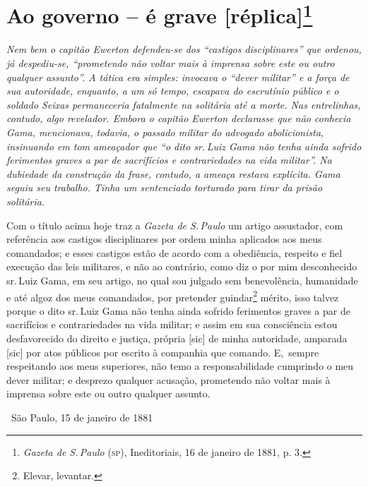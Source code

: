\pagebreak
\section{Ao governo -- é grave {[}réplica{]}\protect\footnote{
\emph{\MakeUppercase{G}azeta de \MakeUppercase{S.\,P}aulo} (\textsc{sp}), \MakeUppercase{I}neditoriais, 16 de janeiro de 1881, p. 3.}}

\begin{resumo}
\emph{Nem bem o capitão Ewerton defendeu-se dos ``castigos disciplinares''
que ordenou, já despediu-se, ``prometendo não voltar mais à imprensa
sobre este ou outro qualquer assunto''. A tática era simples: invocava o
``dever militar'' e a força de sua autoridade, enquanto, a um só tempo,
escapava do escrutínio público e o soldado Seixas permaneceria
fatalmente na solitária até a morte. Nas entrelinhas, contudo, algo
revelador. Embora o capitão Ewerton declarasse que não conhecia Gama,
mencionava, todavia, o passado militar do advogado abolicionista,
insinuando em tom ameaçador que ``o dito sr.\,Luiz Gama não tenha ainda
sofrido ferimentos graves a par de sacrifícios e contrariedades na vida
militar''. Na dubiedade da construção da frase, contudo, a ameaça restava
explícita. Gama seguiu seu trabalho. Tinha um sentenciado torturado para
tirar da prisão solitária. }
\end{resumo}

Com o título acima hoje traz a \emph{Gazeta de S.\,Paulo} um artigo
assustador, com referência aos castigos disciplinares por ordem minha
aplicados aos meus comandados; e esses castigos estão de acordo com a
obediência, respeito e fiel execução das leis militares, e não ao
contrário, como diz o por mim desconhecido sr.\,Luiz Gama, em seu artigo,
no qual sou julgado sem benevolência, humanidade e até algoz dos meus
comandados, por pretender guindar\footnote{Elevar, levantar.}
mérito, isso talvez porque
o dito sr.\,Luiz Gama não tenha ainda sofrido ferimentos graves a par de
sacrifícios e contrariedades na vida militar; e assim em sua consciência
estou desfavorecido do direito e justiça, própria {[}sic{]} de minha
autoridade, amparada {[}sic{]} por atos públicos por escrito à companhia
que comando. E,~sempre respeitando aos meus superiores, não temo a
responsabilidade cumprindo o meu dever militar; e desprezo qualquer
acusação, prometendo não voltar mais à imprensa sobre este ou outro
qualquer assunto.

\medskip
\hfill\ São Paulo, 15 de janeiro de 1881

